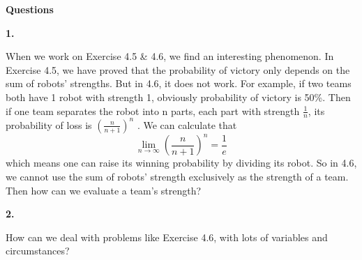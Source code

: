 \documentclass{article} %
\begin{document}
	\textbf{Questions}\par
	\textbf{1.}\par
	When we work on Exercise 4.5 \& 4.6, we find an interesting phenomenon.
	In Exercise 4.5, we have proved that the probability of victory only depends on the sum of robots’ strengths. But in 4.6, it does not work. For example, if two teams both have 1 robot with strength 1, obviously probability of victory is 50\%. Then if one team separates the robot into n parts, each part with strength $\frac{1}{n}$, its probability of loss is $(\frac{n}{n+1})^n$ . We can calculate that $$\lim_{n\to \infty}(\frac{n}{n+1})^n=\frac{1}{e}$$  which means one can raise its winning probability by dividing its robot.
	So in 4.6, we cannot use the sum of robots’ strength exclusively as the strength of a team. Then how can we evaluate a team’s strength?\par
\textbf{2.}\par
	How can we deal with problems like Exercise 4.6, with lots of variables and circumstances?
\end{document}
